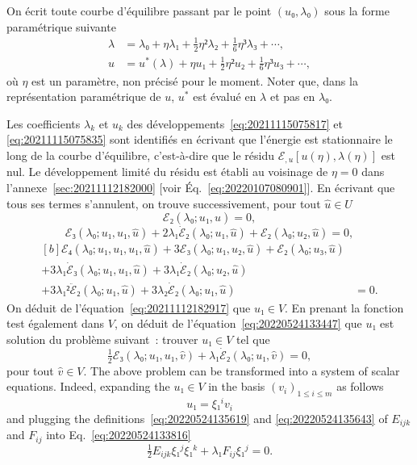 \documentclass[12pt, final]{scrartcl}
\theoremstyle{definition}
\begin{document}
On écrit toute courbe d'équilibre passant par le point \((u₀, λ₀)\) sous la
forme paramétrique suivante
\begin{align}
  \label{eq:20211115075817}
  λ &=  λ₀ + η λ₁ + \tfrac{1}{2} η² λ₂ + \tfrac{1}{6} η³ λ₃ + \cdots,\\
  \label{eq:20211115075835}
  u &= u^{\ast}(λ) + η u₁ + \tfrac{1}{2} η² u₂ + \tfrac{1}{6} η³ u₃ + \cdots,
\end{align}
où \(η\) est un paramètre, non précisé pour le moment. Noter que, dans la
représentation paramétrique de \(u\), \(u^{\ast}\) est évalué en \(λ\) et pas en
\(λ₀\).

Les coefficients \(λ_k\) et \(u_k\) des développements~\eqref{eq:20211115075817}
et \eqref{eq:20211115075835} sont identifiés en écrivant que l'énergie est
stationnaire le long de la courbe d'équilibre, c'est-à-dire que le résidu
\(ℰ_{, u} [u(η), λ(η)]\) est nul. Le développement limité du résidu est établi
au voisinage de \(η = 0\) dans l'annexe~\ref{sec:20211112182000} [voir
Éq.~\eqref{eq:20220107080901}]. En écrivant que tous ses termes s'annulent, on
trouve successivement, pour tout \(\hat{u}∈U\)
\begin{equation}
  \label{eq:20211112182917}
  ℰ₂(λ₀; u₁, \hat{u}) = 0,
\end{equation}
\begin{equation}
  \label{eq:20220524133447}
  ℰ₃(λ₀; u₁, u₁, \hat{u}) + 2λ₁\dot{ℰ}₂(λ₀; u₁, \hat{u}) + ℰ₂(λ₀; u₂, \hat{u}) = 0,
\end{equation}
\begin{equation}
  \label{eq:20220708060436}
  \begin{aligned}[b]
    ℰ₄(λ₀; u₁, u₁, u₁, \hat{u}) + 3ℰ₃(λ₀; u₁, u₂, \hat{u}) + ℰ₂(λ₀; u₃, \hat{u})&\\
    + 3λ₁\dot{ℰ}₃(λ₀; u₁, u₁, \hat{u}) + 3λ₁\dot{ℰ}₂(λ₀;  u₂, \hat{u})&\\
    + 3λ₁²\ddot{ℰ}₂(λ₀; u₁, \hat{u}) + 3λ₂\dot{ℰ}₂(λ₀; u₁, \hat{u}) & = 0.
  \end{aligned}
\end{equation}
On déduit de l'équation~\eqref{eq:20211112182917} que \(u₁∈V\). En prenant la
fonction test également dans \(V\), on déduit de
l'équation~\eqref{eq:20220524133447} que \(u₁\) est solution du problème
suivant~: trouver \(u₁∈V\) tel que
\begin{equation}
  \label{eq:20220524133816}
  \tfrac{1}{2} ℰ₃(λ₀; u₁, u₁, \hat{v}) + λ₁\dot{ℰ}₂(λ₀; u₁, \hat{v}) = 0,
\end{equation}
pour tout \(\hat{v}∈V\). The above problem can be transformed into a system of
scalar equations. Indeed, expanding the \(u₁∈V\) in the basis
\((v_i)_{1 ≤ i ≤ m}\) as follows
\begin{equation}
  \label{eq:20220524133944}
  u₁ = ξ₁^i v_i
\end{equation}
and plugging the definitions~\eqref{eq:20220524135619} and
\eqref{eq:20220524135643} of \(E_{ijk}\) and \(F_{ij}\) into
Eq.~\eqref{eq:20220524133816}
\begin{equation}
  \label{eq:20220524135036}
  \tfrac{1}{2} E_{ijk} ξ₁^j ξ₁^k + λ₁ F_{ij} ξ₁^j = 0.
\end{equation}
\end{document}
